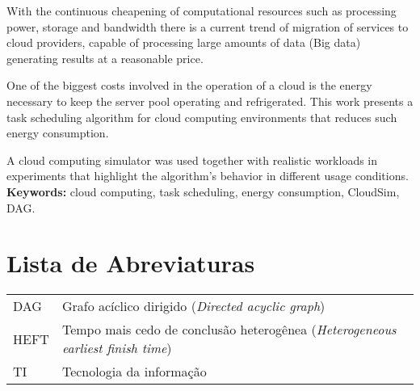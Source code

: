 \documentclass[11pt,twoside,a4paper]{book}
\begin{document}
With the continuous cheapening of computational resources such as processing
power, storage and bandwidth there is a current trend of migration of services
to cloud providers, capable of processing large amounts of data (Big data) 
generating results at a reasonable price.

One of the biggest costs involved in the operation of a cloud is the energy
necessary to keep the server pool operating and refrigerated. This work
presents a task scheduling algorithm for cloud computing
environments that reduces such energy consumption.

A cloud computing simulator was used together with realistic workloads in
experiments that highlight the algorithm's behavior in different
usage conditions.\\

\noindent \textbf{Keywords:} cloud computing, task scheduling, energy
consumption, CloudSim, DAG.

\newpage
\thispagestyle{empty}
\null
\vfill
{}
\tableofcontents    %

\chapter{Lista de Abreviaturas}
\begin{tabular}{ll}
         DAG         & Grafo acíclico dirigido (\emph{Directed acyclic graph})\\
        HEFT         & Tempo mais cedo de conclusão heterogênea (\emph{Heterogeneous earliest finish time})\\
          TI         & Tecnologia da informação\\
\end{tabular}

\end{document}
